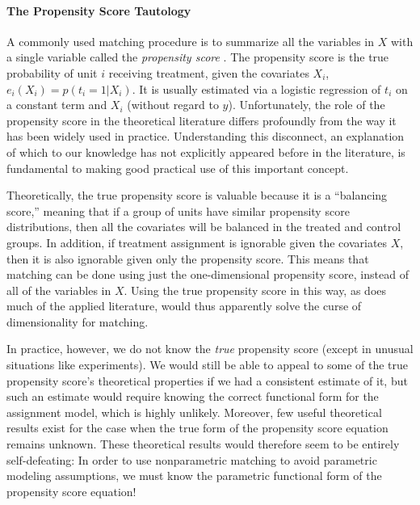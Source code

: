 \documentclass[11pt,titlepage]{article}
\begin{document}
\paragraph{The Propensity Score Tautology}
A commonly used matching procedure is to summarize all the variables
in $X$ with a single variable called the \emph{propensity score}
\citep{RosRub83}.  The propensity score is the true probability of
unit $i$ receiving treatment, given the covariates $X_i$, $e_i(X_i) =
p(t_i=1 | X_i)$.  It is usually estimated via a logistic regression of
$t_i$ on a constant term and $X_i$ (without regard to $y$).
Unfortunately, the role of the propensity score in the theoretical
literature differs profoundly from the way it has been widely used in
practice.  Understanding this disconnect, an explanation of which to
our knowledge has not explicitly appeared before in the literature, is
fundamental to making good practical use of this important concept.

Theoretically, the true propensity score is valuable because it is a
``balancing score,'' meaning that if a group of units have similar
propensity score distributions, then all the covariates will be
balanced in the treated and control groups.  In addition, if treatment
assignment is ignorable given the covariates $X$, then it is also
ignorable given only the propensity score.  This means that matching
can be done using just the one-dimensional propensity score, instead
of all of the variables in $X$.  Using the true propensity score in
this way, as does much of the applied literature, would thus
apparently solve the curse of dimensionality for matching.

In practice, however, we do not know the \emph{true} propensity score
(except in unusual situations like experiments).  We would still be
able to appeal to some of the true propensity score's theoretical
properties if we had a consistent estimate of it, but such an estimate
would require knowing the correct functional form for the assignment
model, which is highly unlikely.  Moreover, few useful theoretical
results exist for the case when the true form of the propensity score
equation remains unknown.  These theoretical results would therefore
seem to be entirely self-defeating: In order to use nonparametric
matching to avoid parametric modeling assumptions, we must know the
parametric functional form of the propensity score equation!
\end{document}
